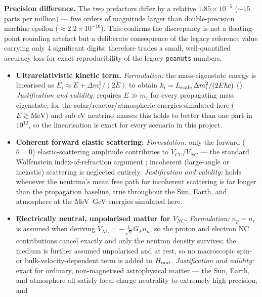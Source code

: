 \begin{notebox}
\textbf{Precision difference.} The two prefactors differ by a relative
$1.85\times10^{-5}$ ($\sim 15$ parts per million) --- five orders of
magnitude larger than double-precision machine epsilon
($\approx2.2\times10^{-16}$). This confirms the discrepancy is not a
floating-point rounding artefact but a deliberate consequence of the legacy
reference value carrying only 4 significant digits; 
therefore trades a small, well-quantified accuracy loss for exact
reproducibility of the legacy \texttt{peanuts} numbers.
\end{notebox}

\begin{notebox}
\begin{itemize}
  \item \textbf{Ultrarelativistic kinetic term.} \emph{Formulation:} the
    mass-eigenstate energy is linearised as $E_i\approx E+\Delta m_i^2/(2E)$
    to obtain $k_i=L_{\rm scale}\,\Delta m_i^2/(2E\hbar c)$
    (). \emph{Justification and validity:}
    requires $E\gg m_i$ for every propagating mass eigenstate; for the
    solar/reactor/atmospheric energies simulated here
    ($E\gtrsim\mathrm{MeV}$) and sub-eV neutrino masses this holds to better
    than one part in $10^{12}$, so the linearisation is exact for every
    scenario in this project.
  \item \textbf{Coherent forward elastic scattering.} \emph{Formulation:}
    only the forward ($\theta=0$) elastic-scattering amplitude contributes
    to $V_{CC}$/$V_{NC}$ --- the standard Wolfenstein index-of-refraction
    argument \parencite{Wolfenstein1978}; incoherent (large-angle or
    inelastic) scattering is neglected entirely.
    \emph{Justification and validity:} holds whenever the neutrino's mean
    free path for incoherent scattering is far longer than the propagation
    baseline, true throughout the Sun, Earth, and atmosphere at the
    MeV--GeV energies simulated here.
  \item \textbf{Electrically neutral, unpolarised matter for $V_{NC}$.}
    \emph{Formulation:} $n_p=n_e$ is assumed when deriving
    $V_{NC}=-\tfrac1{\sqrt2}G_F n_n$, so the proton and electron NC
    contributions cancel exactly and only the neutron density survives; the
    medium is further assumed unpolarised and at rest, so no macroscopic
    spin- or bulk-velocity-dependent term is added to $H_{\rm mat}$.
    \emph{Justification and validity:} exact for ordinary,
    non-magnetised astrophysical matter --- the Sun, Earth, and atmosphere
    all satisfy local charge neutrality to extremely high precision, and

\end{itemize}
\end{notebox}
